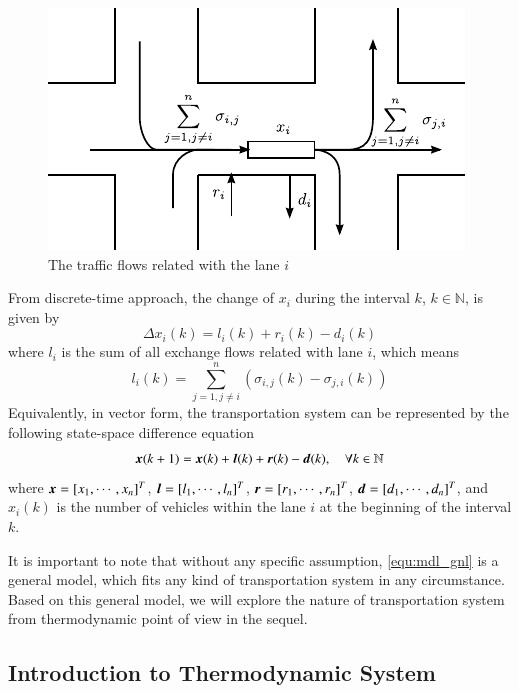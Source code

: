 \documentclass[preprint,authoryear,12pt]{elsarticle}
\renewcommand{\vec}[1]{\mbox{\boldmath$#1$}}
\begin{document}
\begin{figure}[ht]
  \centering
  \includegraphics{pics/flows}
  \caption{The traffic flows related with the lane $i$}
  \label{fig:flows}
\end{figure}

From discrete-time approach, the change of $x_i$ during the interval
$k$, $k\in\mathbb{N}$, is given by
\begin{equation}\label{equ:mdl_gnl_lane}
\Delta x_i(k) = l_i(k)+r_i(k)-d_i(k)
\end{equation}
where $l_i$ is the sum of all exchange flows related with lane $i$,
which means
\begin{equation}\label{equ:exchange_vehicle}
 l_i(k)=\sum_{j=1,j\neq i}^{n}(\sigma_{i,j}(k)-\sigma_{j,i}(k))
\end{equation}
Equivalently, in vector form, the transportation system can be
represented by the following state-space difference equation
\begin{equation}\label{equ:mdl_gnl}
\vec{x}(k+1)=\vec{x}(k)+\vec{l}(k)+\vec{r}(k)-\vec{d}(k),\quad \forall k\in\mathbb{N}
\end{equation}
where $\vec{x}=[x_1,\cdots,x_n]^T$, $\vec{l}=[l_1,\cdots,l_n]^T$,
$\vec{r}=[r_1,\cdots,r_n]^T$, $\vec{d}=[d_1,\cdots,d_n]^T$, and
$x_i(k)$ is the number of vehicles within the lane $i$ at the
beginning of the interval $k$.

It is important to note that without any specific assumption,
\eqref{equ:mdl_gnl} is a general model, which fits any kind of
transportation system in any circumstance. Based on this general
model, we will explore the nature of transportation system from
thermodynamic point of view in the sequel.

\subsection{Introduction to Thermodynamic System}
\end{document}
